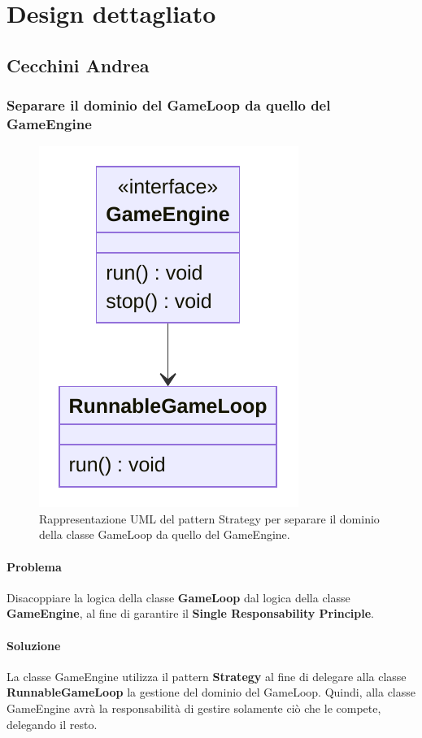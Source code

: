 \documentclass[a4paper,12pt]{report}
\begin{document}
\section{Design dettagliato}
%
\subsection*{Cecchini Andrea}
%
\subsubsection*{Separare il dominio del GameLoop da quello del GameEngine}
%
\begin{figure}[H]
	\centering{}
	\includegraphics[scale=0.75]{img/GameEngineAndGameLoop.pdf}
	\caption{Rappresentazione UML del pattern Strategy per separare il dominio della classe GameLoop da quello del GameEngine.}
	\label{img:strategy}
	\end{figure}
%
\paragraph*{Problema} Disacoppiare la logica della classe \textbf{GameLoop} dal logica della classe \textbf{GameEngine}, al fine di garantire il \textbf{Single Responsability Principle}.
%
\paragraph*{Soluzione} La classe GameEngine utilizza il pattern \textbf{Strategy} al fine di delegare alla classe \textbf{RunnableGameLoop} la gestione del dominio del GameLoop. 
Quindi, alla classe GameEngine avrà la responsabilità di gestire solamente ciò che le compete, delegando il resto.
%
\end{document}
